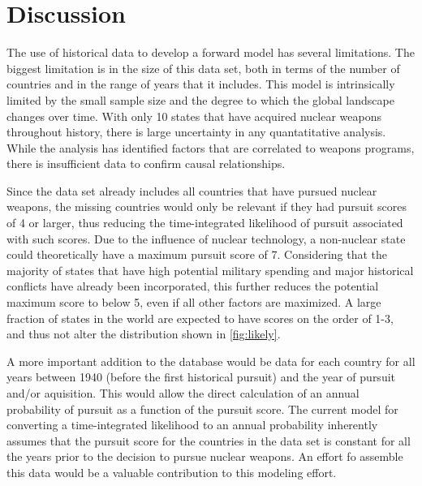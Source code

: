 \section{Discussion}
\label{s_discuss}
The use of historical data to develop a forward model has several limitations. The biggest limitation is in the size of this data set, both in terms of the number of countries and in the range of years that it includes.  This model is intrinsically limited by the small sample size and the degree to which the global landscape changes over time. With only 10 states that have acquired nuclear weapons throughout history, there is large uncertainty in any quantatitative analysis. While the analysis has identified factors that are correlated to weapons programs, there is insufficient data to confirm causal relationships.

Since the data set already includes all countries that have pursued nuclear weapons, the missing countries would only be relevant if they had pursuit scores of 4 or larger, thus reducing the time-integrated likelihood of pursuit associated with such scores. Due to the influence of nuclear technology, a non-nuclear state could theoretically have a maximum pursuit score of 7. Considering that the majority of states that have high potential military spending and major historical conflicts have already been incorporated, this further reduces the potential maximum score to below 5, even if all other factors are maximized.  A large fraction of states in the world are expected to have scores on the order of 1-3, and thus not alter the distribution shown in \ref{fig:likely}.

A more important addition to the database would be data for each country for all years between 1940 (before the first historical pursuit) and the year of pursuit and/or aquisition.  This would allow the direct calculation of an annual probability of pursuit as a function of the pursuit score.  The current model for converting a time-integrated likelihood to an annual probability inherently assumes that the pursuit score for the countries in the data set is constant for all the years prior to the decision to pursue nuclear weapons.  An effort fo assemble this data would be a valuable contribution to this modeling effort.



